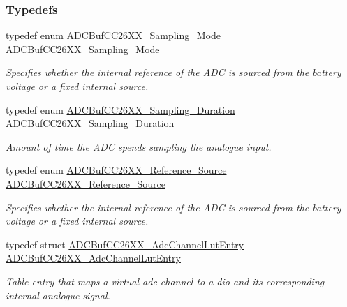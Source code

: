 \subsubsection*{Typedefs}
\begin{DoxyCompactItemize}
\item 
typedef enum \hyperlink{_a_d_c_buf_c_c26_x_x_8h_a816f299f98f8fc3cc1124cda74a18d10}{A\+D\+C\+Buf\+C\+C26\+X\+X\+\_\+\+Sampling\+\_\+\+Mode} \hyperlink{_a_d_c_buf_c_c26_x_x_8h_a49a153bb66450bc16c5e2ac674fad698}{A\+D\+C\+Buf\+C\+C26\+X\+X\+\_\+\+Sampling\+\_\+\+Mode}
\begin{DoxyCompactList}\small\item\em Specifies whether the internal reference of the A\+D\+C is sourced from the battery voltage or a fixed internal source. \end{DoxyCompactList}\item 
typedef enum \hyperlink{_a_d_c_buf_c_c26_x_x_8h_a4a95bf383dea0206b6708496a034a9fb}{A\+D\+C\+Buf\+C\+C26\+X\+X\+\_\+\+Sampling\+\_\+\+Duration} \hyperlink{_a_d_c_buf_c_c26_x_x_8h_aeccab39075ab39a107100cfbbc473c47}{A\+D\+C\+Buf\+C\+C26\+X\+X\+\_\+\+Sampling\+\_\+\+Duration}
\begin{DoxyCompactList}\small\item\em Amount of time the A\+D\+C spends sampling the analogue input. \end{DoxyCompactList}\item 
typedef enum \hyperlink{_a_d_c_buf_c_c26_x_x_8h_a31a41d718712f3d4ff936bb566da0d0a}{A\+D\+C\+Buf\+C\+C26\+X\+X\+\_\+\+Reference\+\_\+\+Source} \hyperlink{_a_d_c_buf_c_c26_x_x_8h_a55267edc4a4440dd55b97f3384474f80}{A\+D\+C\+Buf\+C\+C26\+X\+X\+\_\+\+Reference\+\_\+\+Source}
\begin{DoxyCompactList}\small\item\em Specifies whether the internal reference of the A\+D\+C is sourced from the battery voltage or a fixed internal source. \end{DoxyCompactList}\item 
typedef struct \hyperlink{struct_a_d_c_buf_c_c26_x_x___adc_channel_lut_entry}{A\+D\+C\+Buf\+C\+C26\+X\+X\+\_\+\+Adc\+Channel\+Lut\+Entry} \hyperlink{_a_d_c_buf_c_c26_x_x_8h_a99e197fd4f1d0021a0737f74f80d2643}{A\+D\+C\+Buf\+C\+C26\+X\+X\+\_\+\+Adc\+Channel\+Lut\+Entry}
\begin{DoxyCompactList}\small\item\em Table entry that maps a virtual adc channel to a dio and its corresponding internal analogue signal. \end{DoxyCompactList}\item 

\end{DoxyCompactItemize}
